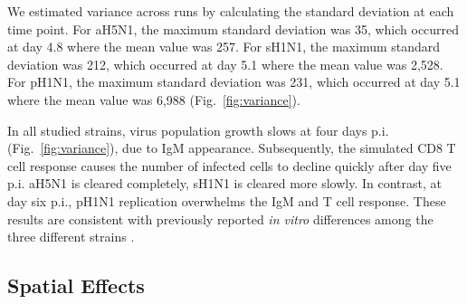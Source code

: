 \documentclass[preprint,10pt,authoryear]{elsarticle}
\begin{document}

We estimated variance across runs by calculating the standard deviation at each time point.  For aH5N1, the maximum standard deviation was 35, which occurred at day 4.8 where the mean value was 257.  For sH1N1, the maximum standard deviation was 212, which occurred at day 5.1 where the mean value was 2,528.  For pH1N1, the maximum standard deviation was 231, which occurred at day 5.1 where the mean value was 6,988 (Fig.~\ref{fig:variance}).

In all studied strains, virus population growth slows at four days p.i. (Fig.~\ref{fig:variance}), due to IgM appearance.  Subsequently, the simulated CD8 T cell response causes the number of infected cells to decline quickly after day five p.i.  aH5N1 is cleared completely, sH1N1 is cleared more slowly.  In contrast, at day six p.i., pH1N1 replication overwhelms the IgM and T cell response.  These results are consistent with previously reported \textit{in vitro} differences among the three different strains \citep{Mitchell2011}.



\subsection*{Spatial Effects}

\end{document}

